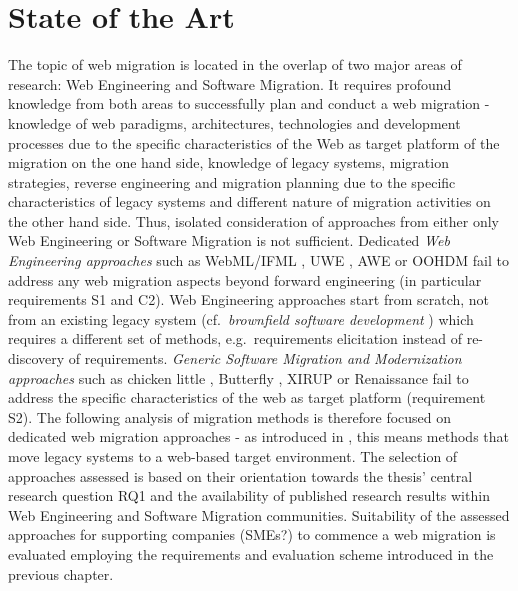 \hypertarget{sec:sota}{%
\chapter{State of the Art}\label{sec:sota}}

The topic of web migration is located in the overlap of two major areas of research: Web Engineering and Software Migration.
It requires profound knowledge from both areas to successfully plan and conduct a web migration - knowledge of web paradigms, architectures, technologies and development processes due to the specific characteristics of the Web as target platform of the migration on the one hand side, knowledge of legacy systems, migration strategies, reverse engineering and migration planning due to the specific characteristics of legacy systems and different nature of migration activities on the other hand side.
Thus, isolated consideration of approaches from either only Web Engineering or Software Migration is not sufficient.
Dedicated \emph{Web Engineering approaches} such as WebML/IFML \autocite{OMG2015IFML}, UWE \autocite{Koch2008UWE}, AWE \autocite{McDonald2005AWE} or OOHDM \autocite{Schwabe1996OOHDM} fail to address any web migration aspects beyond forward engineering (in particular requirements S1 and C2).
Web Engineering approaches start from scratch, not from an existing legacy system (cf.~\emph{brownfield software development} \autocite{Hopkins2008Brownfield}) which requires a different set of methods, e.g.~requirements elicitation instead of re-discovery of requirements.
\emph{Generic Software Migration and Modernization approaches} such as chicken little \autocite{Brodie1995Migrating}, Butterfly \autocite{BingWu1997Butterfly}, XIRUP\autocite{Fuentes-Fernandez2012XIRUP} or Renaissance \autocite{Warren2002Renaissance} fail to address the specific characteristics of the web as target platform (requirement S2).
The following analysis of migration methods is therefore focused on dedicated web migration approaches - as introduced in , this means methods that move legacy systems to a web-based target environment.
The selection of approaches assessed is based on their orientation towards the thesis' central research question RQ1 and the availability of published research results within Web Engineering and Software Migration communities.
Suitability of the assessed approaches for supporting companies (SMEs?) to commence a web migration is evaluated employing the requirements and evaluation scheme introduced in the previous chapter.

